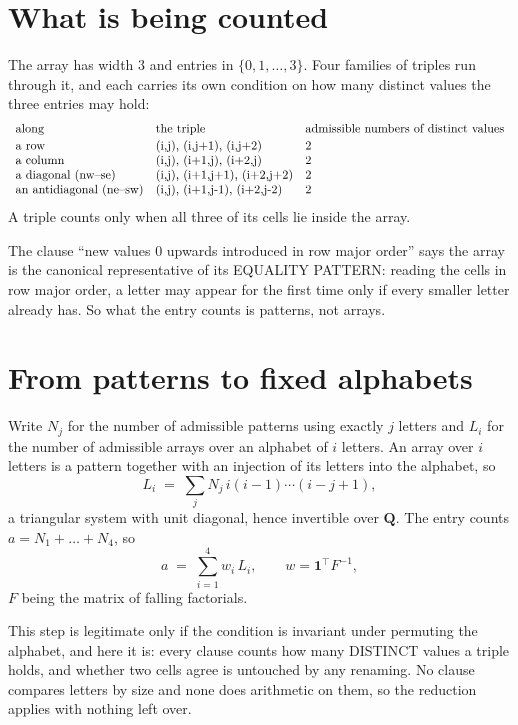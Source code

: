 \documentclass[11pt,a4paper]{article}
\theoremstyle{plain}
\theoremstyle{definition}
\begin{document}
\section{What is being counted}

The array has width $3$ and entries in $\{0,1,\dots,3\}$. Four families of triples
run through it, and each carries its own condition on how many distinct values the three
entries may hold:
\[
\begin{array}{lll}
\text{along} & \text{the triple} & \text{admissible numbers of distinct values} \\[2pt]
\text{a row} & $(i,j),\ (i,j+1),\ (i,j+2)$ & $2$ \\
\text{a column} & $(i,j),\ (i+1,j),\ (i+2,j)$ & $2$ \\
\text{a diagonal (nw--se)} & $(i,j),\ (i+1,j+1),\ (i+2,j+2)$ & $2$ \\
\text{an antidiagonal (ne--sw)} & $(i,j),\ (i+1,j-1),\ (i+2,j-2)$ & $2$ \\
\end{array}
\]
A triple counts only when all three of its cells lie inside the array.

The clause ``new values $0$ upwards introduced in row major order'' says the array is the
canonical representative of its EQUALITY PATTERN: reading the cells in row major order, a
letter may appear for the first time only if every smaller letter already has. So what the
entry counts is patterns, not arrays.

\section{From patterns to fixed alphabets}

Write $N_j$ for the number of admissible patterns using exactly $j$ letters and $L_i$ for the
number of admissible arrays over an alphabet of $i$ letters. An array over $i$ letters is a
pattern together with an injection of its letters into the alphabet, so
\[
L_i\;=\;\sum_j N_j\,i(i-1)\cdots(i-j+1),
\]
a triangular system with unit diagonal, hence invertible over $\mathbf{Q}$. The entry counts
$a=N_1+\dots+N_{4}$, so
\[
a\;=\;\sum_{i=1}^{4}w_i\,L_i ,\qquad w=\mathbf{1}^{\!\top}F^{-1},
\]
$F$ being the matrix of falling factorials.

This step is legitimate only if the condition is invariant under permuting the alphabet, and
here it is: every clause counts how many DISTINCT values a triple holds, and whether two cells
agree is untouched by any renaming. No clause compares letters by size and none does arithmetic
on them, so the reduction applies with nothing left over.
\end{document}
